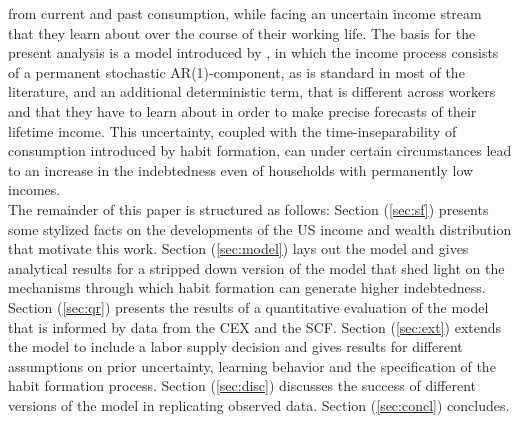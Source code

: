 from current and past consumption, while facing an uncertain income stream that they learn about over the course of their working life. The basis for the present analysis is a model introduced by \citet{Guvenen2007}, in which the income process consists of a permanent stochastic AR(1)-component, as is standard in most of the literature, and an additional deterministic term, that is different across workers and that they have to learn about in order to make precise forecasts of their lifetime income. This uncertainty, coupled with the time-inseparability of consumption introduced by habit formation, can under certain circumstances lead to an increase in the indebtedness even of households with permanently low incomes. \\
The remainder of this paper is structured as follows: Section (\ref{sec:sf}) presents some stylized facts on the developments of the US income and wealth distribution that motivate this work. Section (\ref{sec:model}) lays out the model and gives analytical results for a stripped down version of the model that shed light on the mechanisms through which habit formation can generate higher indebtedness. Section (\ref{sec:qr}) presents the results of a quantitative evaluation of the model that is informed by data from the CEX and the SCF. Section (\ref{sec:ext}) extends the model to include a labor supply decision and gives results for different assumptions on prior uncertainty, learning behavior and the specification of the habit formation process. Section (\ref{sec:disc}) discusses the success of different versions of the model in replicating observed data. Section (\ref{sec:concl}) concludes.  


\pagebreak

